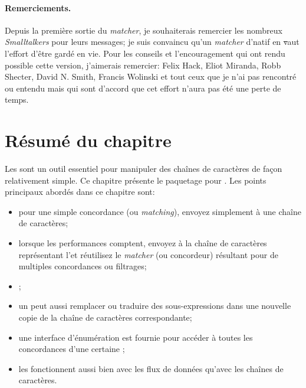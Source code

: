 \documentclass[a4paper,10pt,twoside]{book}
\begin{document}
\paragraph{Remerciements.}
Depuis la première sortie du \emph{matcher}, je souhaiterais remercier
les nombreux \emph{Smalltalkers} pour leurs messages; je suis
convaincu qu'un \emph{matcher} d'\expreg natif en \st vaut l'effort 
d'être gardé en vie. Pour les conseils et l'encouragement qui ont rendu
possible cette version, j'aimerais remercier:
Felix Hack, Eliot Miranda, Robb Shecter, David N. Smith, Francis
Wolinski et tout ceux que je n'ai pas rencontré ou entendu mais qui sont
d'accord que cet effort n'aura pas été une perte de temps.

\section{Résumé du chapitre}

Les \expregs sont un outil essentiel pour manipuler des chaînes de
caractères de façon relativement simple.
Ce chapitre présente le paquetage \pkgregex pour \pharo. Les points
principaux abordés dans ce chapitre sont:

\begin{itemize}
\item pour une simple concordance (ou \emph{matching}), envoyez
  simplement  à une chaîne de caractères;
\item lorsque les performances comptent, envoyez  à la
  chaîne de caractères représentant l'\expreg et réutilisez le
  \emph{matcher} (ou concordeur) résultant pour de multiples
  concordances ou filtrages;
\item {};
\item un \regexmatch peut aussi remplacer ou traduire des
  sous-expressions dans une nouvelle copie de la chaîne de caractères correspondante;
\item une interface d'énumération est fournie pour accéder à toutes
  les concordances d'une certaine \expreg;
\item les \expregs fonctionnent aussi bien avec les flux de données
  qu'avec les chaînes de caractères.
\end{itemize}


\ifx\wholebook\relax\else
   
   
\end{document}
